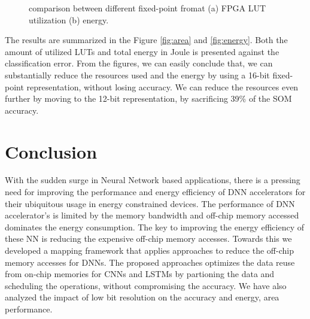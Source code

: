 \documentclass[a4paper,10pt]{article}
\begin{document}
\begin{figure}[!htb]
	\centering
	\hfil
	\caption{comparison between different fixed-point fromat (a) FPGA LUT utilization (b) energy.}
	\label{fig:metrics}
\end{figure}

The results are summarized in the Figure \ref{fig:area} and \ref{fig:energy}. Both the amount of utilized LUTs and total energy in Joule is presented against the classification error. From the figures, we can easily conclude that, we can substantially reduce the resources used and the energy by using a 16-bit fixed-point representation, without losing accuracy. We can reduce the resources even further by moving to the 12-bit representation, by sacrificing 39\% of the SOM accuracy. 

\section{Conclusion}
With the sudden surge in Neural Network based applications, there is a pressing need for improving the performance and energy efficiency of DNN accelerators for their ubiquitous usage in energy constrained devices. The performance of DNN accelerator's is limited by the memory bandwidth and off-chip memory accessed dominates the energy consumption. The key to improving the energy efficiency of these NN is reducing the expensive off-chip memory accesses. Towards this we developed a mapping framework that applies approaches to reduce the off-chip memory accesses for DNNs. The proposed approaches optimizes the data reuse from on-chip memories for CNNs and LSTMs by partioning the data and scheduling the operations, without compromising the accuracy. We have also analyzed the impact of low bit resolution on the accuracy and energy, area performance. 

\footnotesize

\end{document}
